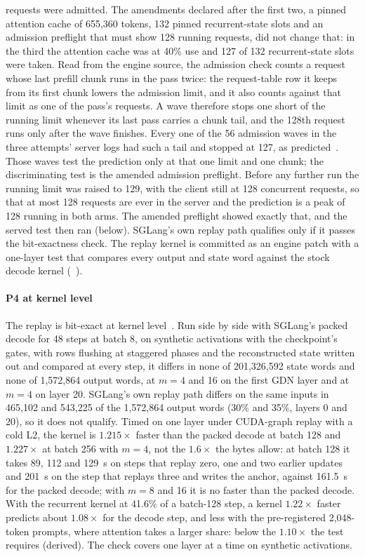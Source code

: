 requests were admitted. The amendments declared after the first two, a pinned attention cache of 655,360 tokens, 132 pinned recurrent-state slots and an admission preflight that must show 128 running requests, did not change that: in the third the attention cache was at 40\% use and 127 of 132 recurrent-state slots were taken. Read from the engine source, the admission check counts a request whose last prefill chunk runs in the pass twice: the request-table row it keeps from its first chunk lowers the admission limit, and it also counts against that limit as one of the pass's requests. A wave therefore stops one short of the running limit whenever its last pass carries a chunk tail, and the 128th request runs only after the wave finishes. Every one of the 56 admission waves in the three attempts' server logs had such a tail and stopped at 127, as predicted~. Those waves test the prediction only at that one limit and one chunk; the discriminating test is the amended admission preflight. Before any further run the running limit was raised to 129, with the client still at 128 concurrent requests, so that at most 128 requests are ever in the server and the prediction is a peak of 128 running in both arms. The amended preflight showed exactly that, and the served test then ran (below). SGLang's own replay path qualifies only if it passes the bit-exactness check. The replay kernel is committed as an engine patch with a one-layer test that compares every output and state word against the stock decode kernel (~).

\paragraph{P4 at kernel level} The replay is bit-exact at kernel level~. Run side by side with SGLang's packed decode for 48 steps at batch 8, on synthetic activations with the checkpoint's gates, with rows flushing at staggered phases and the reconstructed state written out and compared at every step, it differs in none of 201,326,592 state words and none of 1,572,864 output words, at $m=4$ and 16 on the first GDN layer and at $m=4$ on layer 20. SGLang's own replay path differs on the same inputs in 465,102 and 543,225 of the 1,572,864 output words (30\% and 35\%, layers 0 and 20), so it does not qualify. Timed on one layer under CUDA-graph replay with a cold L2, the kernel is $1.215\times$ faster than the packed decode at batch 128 and $1.227\times$ at batch 256 with $m=4$, not the $1.6\times$ the bytes allow: at batch 128 it takes 89, 112 and 129~\textmu s on steps that replay zero, one and two earlier updates and 201~\textmu s on the step that replays three and writes the anchor, against 161.5~\textmu s for the packed decode; with $m=8$ and 16 it is no faster than the packed decode. With the recurrent kernel at 41.6\% of a batch-128 step, a kernel $1.22\times$ faster predicts about $1.08\times$ for the decode step, and less with the pre-registered 2,048-token prompts, where attention takes a larger share: below the $1.10\times$ the test requires (derived). The check covers one layer at a time on synthetic activations.

